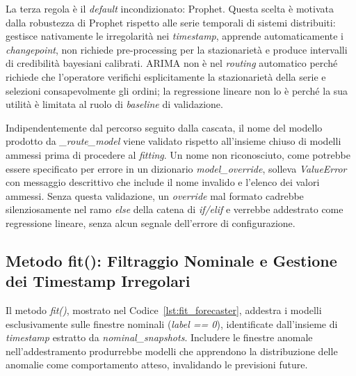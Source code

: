 La terza regola è il \textit{default} incondizionato: Prophet. Questa scelta è motivata dalla
robustezza di Prophet rispetto alle serie temporali di sistemi distribuiti: gestisce nativamente
le irregolarità nei \textit{timestamp}, apprende automaticamente i \textit{changepoint}, non
richiede pre-processing per la stazionarietà e produce intervalli di credibilità bayesiani
calibrati. ARIMA non è nel \textit{routing} automatico perché richiede che l'operatore verifichi
esplicitamente la stazionarietà della serie e selezioni consapevolmente gli ordini; la regressione
lineare non lo è perché la sua utilità è limitata al ruolo di \textit{baseline} di validazione.

Indipendentemente dal percorso seguito dalla cascata, il nome del modello prodotto da
\textit{\_route\_model} viene validato rispetto all'insieme chiuso di modelli ammessi prima
di procedere al \textit{fitting}. Un nome non riconosciuto, come potrebbe essere specificato
per errore in un dizionario \textit{model\_override}, solleva \textit{ValueError} con
messaggio descrittivo che include il nome invalido e l'elenco dei valori ammessi. Senza questa
validazione, un \textit{override} mal formato cadrebbe silenziosamente nel ramo \textit{else}
della catena di \textit{if/elif} e verrebbe addestrato come regressione lineare, senza alcun
segnale dell'errore di configurazione.

\subsection{Metodo fit(): Filtraggio Nominale e Gestione dei Timestamp Irregolari}
\label{subsec:fit_method}

Il metodo \textit{fit()}, mostrato nel Codice~\ref{lst:fit_forecaster}, addestra i modelli
esclusivamente sulle finestre nominali (\textit{label == 0}), identificate dall'insieme di
\textit{timestamp} estratto da \textit{nominal\_snapshots}. Includere le finestre anomale
nell'addestramento produrrebbe modelli che apprendono la distribuzione delle anomalie come
comportamento atteso, invalidando le previsioni future.

